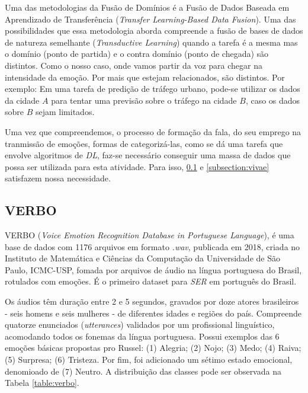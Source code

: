 Uma das metodologias da Fusão de Domínios \cite{49} é a Fusão de Dados Baseada em Aprendizado de Transferência (\textit{Transfer Learning-Based Data Fusion}). Uma das possibilidades que essa metodologia aborda compreende a fusão de bases de dados de natureza semelhante (\textit{Transductive Learning}) quando a tarefa é a mesma mas o domínio (ponto de partida) e o contra domínio (ponto de chegada) são distintos. Como o nosso caso, onde vamos partir da voz para chegar na intensidade da emoção. Por mais que estejam relacionados, são distintos. Por exemplo: Em uma tarefa de predição de tráfego urbano, pode-se utilizar os dados da cidade $A$ para tentar uma previsão sobre o tráfego na cidade $B$, caso os dados sobre $B$ sejam limitados. 

Uma vez que compreendemos, o processo de formação da fala, do seu emprego na tranmissão de emoções, formas de categorizá-las, como se dá uma tarefa que envolve algoritmos de \textit{DL}, faz-se necessário conseguir uma massa de dados que possa ser utilizada para esta atividade. Para isso, \ref{subsection:verbo} e \ref{subsection:vivae} satisfazem nossa necessidade.

\subsection{VERBO}\label{subsection:verbo}

VERBO \cite{12.21} (\textit{Voice Emotion Recognition Database in Portuguese Language}),  é uma base de dados com 1176 arquivos em formato \textit{.wav}, publicada em 2018, criada no Instituto de Matemática e Ciências da Computação da Universidade de São Paulo, ICMC-USP, fomada por arquivos de áudio na língua portuguesa do Brasil, rotulados com emoções. É o primeiro \cite{21} dataset para \textit{SER} em português do Brasil.

Os áudios têm duração entre 2 e 5 segundos, gravados por doze atores brasileiros - seis homens e seis mulheres - de diferentes idades e regiões do país. Compreende quatorze enunciados (\textit{utterances}) validados por um profissional linguístico, acomodando todos os fonemas da língua portuguesa. Possui exemplos das 6 emoções básicas propostas pro Russel: (1) Alegria; (2) Nojo; (3) Medo; (4) Raiva; (5) Surpresa; (6) Tristeza. Por fim, foi adicionado um sétimo estado emocional, denomioado de (7) Neutro. A distribuição das classes pode ser observada na Tabela \ref{table:verbo}.

